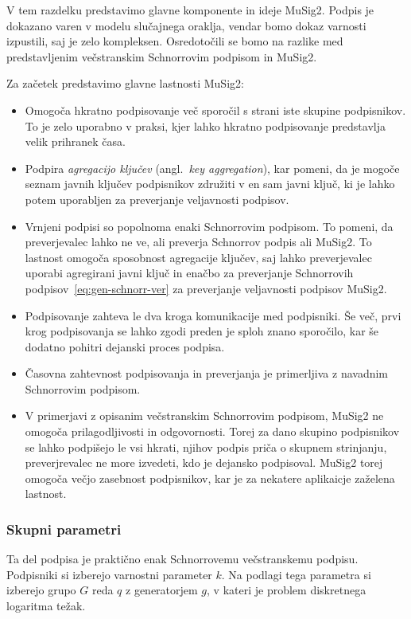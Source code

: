V tem razdelku predstavimo glavne komponente in ideje MuSig2. Podpis je dokazano varen v modelu
slučajnega oraklja, vendar bomo dokaz varnosti izpustili, saj je zelo kompleksen. Osredotočili se
bomo na razlike med predstavljenim večstranskim Schnorrovim podpisom in MuSig2.

Za začetek predstavimo glavne lastnosti MuSig2:
\begin{itemize}
    \item Omogoča hkratno podpisovanje več sporočil s strani iste skupine podpisnikov. To je zelo
        uporabno v praksi, kjer lahko hkratno podpisovanje predstavlja velik prihranek časa.
    \item Podpira \textit{agregacijo ključev} (angl.\ \textit{key aggregation}), kar pomeni, da je
        mogoče seznam javnih ključev podpisnikov združiti v en sam javni ključ, ki je lahko potem
        uporabljen za preverjanje veljavnosti podpisov.
    \item Vrnjeni podpisi so popolnoma enaki Schnorrovim podpisom. To pomeni, da preverjevalec lahko
        ne ve, ali preverja Schnorrov podpis ali MuSig2. To lastnost omogoča sposobnost agregacije
        ključev, saj lahko preverjevalec uporabi agregirani javni ključ in enačbo za preverjanje
        Schnorrovih podpisov~\eqref{eq:gen-schnorr-ver} za preverjanje veljavnosti podpisov MuSig2.
    \item Podpisovanje zahteva le dva kroga komunikacije med podpisniki. Še več, prvi krog podpisovanja
        se lahko zgodi preden je sploh znano sporočilo, kar še dodatno pohitri dejanski proces podpisa.
    \item Časovna zahtevnost podpisovanja in preverjanja je primerljiva z navadnim Schnorrovim
        podpisom.
    \item V primerjavi z opisanim večstranskim Schnorrovim podpisom, MuSig2 ne omogoča prilagodljivosti
        in odgovornosti. Torej za dano skupino podpisnikov se lahko podpišejo le vsi hkrati, njihov
        podpis priča o skupnem strinjanju, preverjrevalec ne more izvedeti, kdo je dejansko podpisoval.
        MuSig2 torej omogoča večjo zasebnost podpisnikov, kar je za nekatere aplikaicje zaželena lastnost.
\end{itemize}

\subsubsection{Skupni parametri}
Ta del podpisa je praktično enak Schnorrovemu večstranskemu podpisu. Podpisniki si izberejo varnostni
parameter $k$. Na podlagi tega parametra si izberejo grupo $G$ reda $q$ z generatorjem $g$, v kateri
je problem diskretnega logaritma težak.

